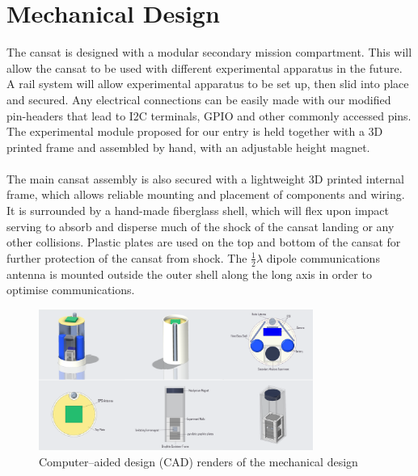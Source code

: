 \documentclass{report}
\begin{document}
	\section{Mechanical Design}


		The cansat is designed with a modular secondary mission compartment. 
		This will allow the cansat to be used with different experimental apparatus 
		in the future. A rail system will allow experimental apparatus to be set up,
		then slid into place and secured. Any electrical connections can be easily
		made with our modified pin-headers that lead to I2C terminals, GPIO and
		other commonly accessed pins. The experimental module proposed for 
		our entry is held together with a 3D printed frame and assembled by 
		hand, with an adjustable height magnet.
		\\\\
		The main cansat assembly is also secured with a lightweight 3D printed
		internal frame, which allows reliable mounting and placement of components
		and wiring. It is surrounded by a hand-made fiberglass shell, which will flex
		upon impact serving to absorb and disperse much of the shock of the
		cansat landing or any other collisions. Plastic plates are used on the top and
		bottom of the cansat for further protection of the cansat from shock. The 
		$\frac{1}{2}\lambda$ dipole communications antenna is mounted outside
		the outer shell along the long axis in order to optimise communications.

		\begin{figure}[H]
			\begin{center}
				\includegraphics[width=0.8\textwidth]{CadRenders}
			\end{center}
			\vspace{-15pt}
			\caption{Computer--aided design (CAD) renders of the mechanical design}
		\end{figure}
\end{document}

